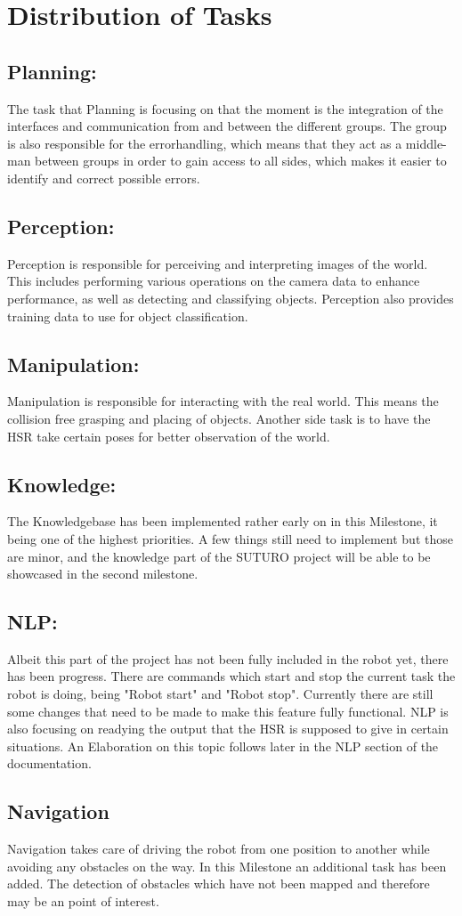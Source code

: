 \documentclass[main.tex]{subfiles}
\begin{document}
	
	\chapter{Distribution of Tasks}

		\section{Planning:}
		The task that Planning is focusing on that the moment is the integration of the interfaces and communication from and between the different groups. The group is also responsible for the errorhandling, which means that they act as a middle-man between groups in order to gain access to all sides, which makes it easier to identify and correct possible errors.
		
		\section{Perception:}
		Perception is responsible for perceiving and interpreting images of the world. This includes performing various operations on the camera data to enhance performance, as well as detecting and classifying objects. Perception also provides training data to use for object classification.
		
		\section{Manipulation:}
		Manipulation is responsible for interacting with the real world. This means the collision free grasping and placing of objects. Another side task is to have the HSR take certain poses for better observation of the world. 
		
		\section{Knowledge:}
		The Knowledgebase has been implemented rather early on in this Milestone, it being one of the highest priorities. A few things still need to implement but those are minor, and the knowledge part of the SUTURO project will be able to be showcased in the second milestone. 
		
		\section{NLP:}
		Albeit this part of the project has not been fully included in the robot yet, there has been progress. There are commands which start and stop the current task the robot is doing, being "Robot start" and "Robot stop". Currently there are still some changes that need to be made to make this feature fully functional. NLP is also focusing on readying the output that the HSR is supposed to give in certain situations. An Elaboration on this topic follows later in the NLP section of the documentation.  
		
		\section{Navigation}
		Navigation takes care of driving the robot from one position to another while avoiding any obstacles on the way. In this Milestone an additional task has been added. The detection of obstacles which have not been mapped and therefore may be an point of interest.
\end{document}
